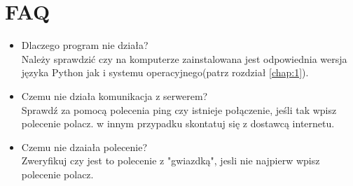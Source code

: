 \documentclass[a4paper,polish,12pt]{article}
\begin{document}
\section{FAQ}
\begin{itemize}
\item Dlaczego program nie działa?\\
Należy sprawdzić czy na komputerze zainstalowana jest odpowiednia wersja języka Python jak i systemu operacyjnego(patrz rozdział \autoref{chap:1}).
\item Czemu nie działa komunikacja z serwerem?\\
Sprawdź za pomocą polecenia ping czy istnieje połączenie, jeśli tak wpisz polecenie polacz. w innym przypadku skontatuj się z dostawcą internetu.
\item Czemu nie dzaiała polecenie?\\
Zweryfikuj czy jest to polecenie z "gwiazdką", jesli nie najpierw wpisz polecenie polacz.
\end{itemize}
\end{document}
